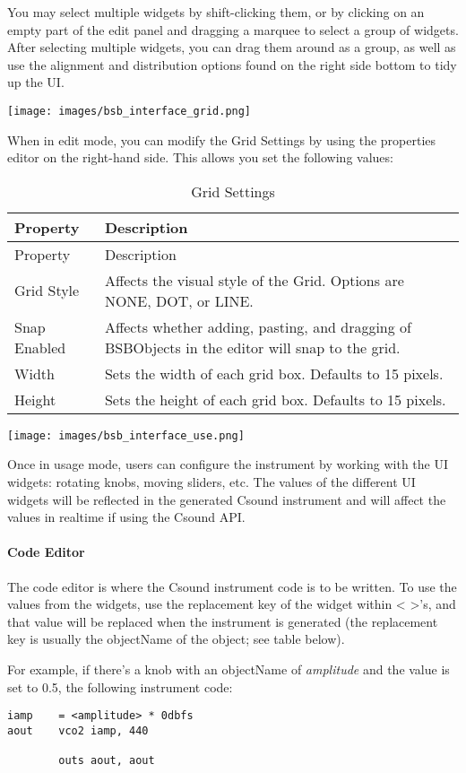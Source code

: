 You may select multiple widgets by shift-clicking them, or by clicking
on an empty part of the edit panel and dragging a marquee to select a
group of widgets. After selecting multiple widgets, you can drag them
around as a group, as well as use the alignment and distribution options
found on the right side bottom to tidy up the UI.

\texttt{[image: images/bsb\_interface\_grid.png]}

When in edit mode, you can modify the Grid Settings by using the
properties editor on the right-hand side. This allows you set the
following values:

\begin{longtable}[]{@{}ll@{}}
\caption{Grid Settings}\tabularnewline
\toprule
Property & Description\tabularnewline
\midrule
\endfirsthead
\toprule
Property & Description\tabularnewline
\midrule
\endhead
Grid Style & Affects the visual style of the Grid. Options are NONE,
DOT, or LINE.\tabularnewline
Snap Enabled & Affects whether adding, pasting, and dragging of
BSBObjects in the editor will snap to the grid.\tabularnewline
Width & Sets the width of each grid box. Defaults to 15
pixels.\tabularnewline
Height & Sets the height of each grid box. Defaults to 15
pixels.\tabularnewline
\bottomrule
\end{longtable}

\texttt{[image: images/bsb\_interface\_use.png]}

Once in usage mode, users can configure the instrument by working with
the UI widgets: rotating knobs, moving sliders, etc. The values of the
different UI widgets will be reflected in the generated Csound
instrument and will affect the values in realtime if using the Csound
API.

\paragraph{Code Editor}

The code editor is where the Csound instrument code is to be written. To
use the values from the widgets, use the replacement key of the widget
within \textless{} \textgreater{}'s, and that value will be replaced
when the instrument is generated (the replacement key is usually the
objectName of the object; see table below).

For example, if there's a knob with an objectName of \emph{amplitude}
and the value is set to 0.5, the following instrument code:

\begin{verbatim}
iamp    = <amplitude> * 0dbfs
aout    vco2 iamp, 440

        outs aout, aout
\end{verbatim}

